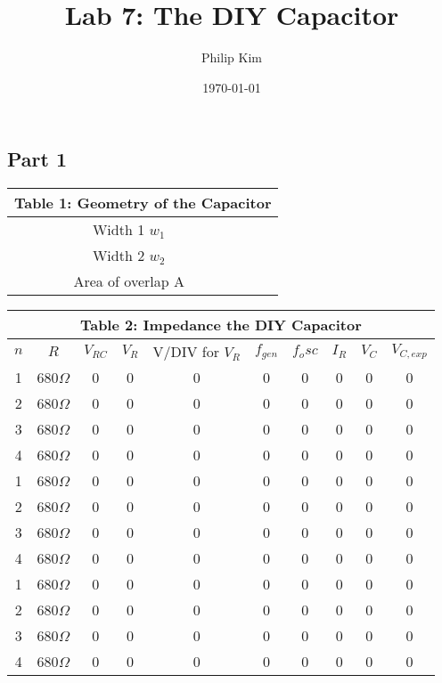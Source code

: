 \documentclass{article}
\title{Lab 7: The DIY Capacitor}
\author{Philip Kim}
\date{\today}
\begin{document}
\maketitle
\vspace*{-1cm}
\begin{table}[!htp]\centering
\subsection*{Part 1}
\begin{tabular}{|c|c|}\hline
  \multicolumn{2}{|c|}{\textbf{Table 1: Geometry of the Capacitor}} \\\hline
  Width 1 \(w_1\) & \\\hline
  Width 2 \(w_2\) & \\\hline
  Area of overlap A & \\\hline
  \end{tabular}
\end{table}

\begin{table}[!htp]\centering
  \begin{tabular}{|c|c|c|c|c|c|c|c|c|c|}\hline
    \multicolumn{10}{|c|}{\textbf{Table 2: Impedance the DIY Capacitor}} \\\hline
    \(n\) & \(R\) & \(V_{RC}\) & \(V_R\) & V/DIV for \(V_R\) & \(f_{gen}\) & \(f_osc\) & \(I_R\) & \(V_C\) & \(V_{C,exp}\) \\\hline
    1 & 680\(\Omega \) & 0 & 0 & 0 & 0 & 0 & 0 & 0 & 0 \\\hline
    2 & 680\(\Omega \) & 0 & 0 & 0 & 0 & 0 & 0 & 0 & 0 \\\hline
    3 & 680\(\Omega \) & 0 & 0 & 0 & 0 & 0 & 0 & 0 & 0 \\\hline
    4 & 680\(\Omega \) & 0 & 0 & 0 & 0 & 0 & 0 & 0 & 0 \\\hline
    1 & 680\(\Omega \) & 0 & 0 & 0 & 0 & 0 & 0 & 0 & 0 \\\hline
    2 & 680\(\Omega \) & 0 & 0 & 0 & 0 & 0 & 0 & 0 & 0 \\\hline
    3 & 680\(\Omega \) & 0 & 0 & 0 & 0 & 0 & 0 & 0 & 0 \\\hline
    4 & 680\(\Omega \) & 0 & 0 & 0 & 0 & 0 & 0 & 0 & 0 \\\hline
    1 & 680\(\Omega \) & 0 & 0 & 0 & 0 & 0 & 0 & 0 & 0 \\\hline
    2 & 680\(\Omega \) & 0 & 0 & 0 & 0 & 0 & 0 & 0 & 0 \\\hline
    3 & 680\(\Omega \) & 0 & 0 & 0 & 0 & 0 & 0 & 0 & 0 \\\hline
    4 & 680\(\Omega \) & 0 & 0 & 0 & 0 & 0 & 0 & 0 & 0 \\\hline
  \end{tabular}
\end{table}
\end{document}
